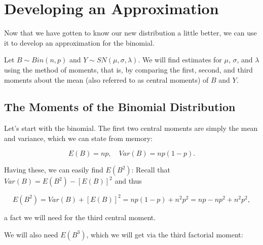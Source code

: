 \documentclass{article}
\begin{document}
\section{Developing an Approximation}
\label{sec:method-of-moments}

Now that we have gotten to know our new distribution a little better, we can
use it to develop an approximation for the binomial.

Let $B \sim Bin(n, p)$ and $Y \sim SN(\mu, \sigma, \lambda)$. We will find
estimates for $\mu$, $\sigma$, and $\lambda$ using the method of moments, that
is, by comparing the first, second, and third moments about the mean (also
referred to as central moments) of $B$ and $Y$.

\subsection{The Moments of the Binomial Distribution}

Let's start with the binomial. The first two central moments are simply the
mean and variance, which we can state from memory:

\begin{equation*}
  E(B) = np, \quad Var(B) = np(1-p).
\end{equation*}

Having these, we can easily find $E(B^2)$: Recall that $Var(B) = E(B^2) -
[E(B)]^2$ and thus

\begin{equation*}
  E(B^2) = Var(B) + [E(B)]^2 = np(1-p) + n^2p^2 = np - np^2 + n^2p^2,
\end{equation*}

a fact we will need for the third central moment.

We will also need $E(B^3)$, which we will get via the third factorial moment:
\end{document}
